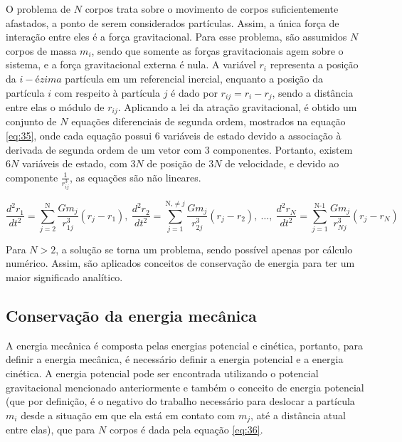 O problema de $N$ corpos trata sobre o movimento de corpos suficientemente afastados, a ponto de serem considerados partículas. Assim, a única força de interação entre eles é a força gravitacional. Para esse problema, são assumidos $N$ corpos de massa $m_{i}$, sendo que somente as forças gravitacionais agem sobre o sistema, e a força gravitacional externa é nula. A variável $r_{i}$ representa a posição da $i-ézima$ partícula em um referencial inercial, enquanto  a posição da partícula $i$ com respeito à partícula $j$ é dado por $r_{ij} = r_{i} - r_{j}$, sendo a distância entre elas o módulo de $r_{ij}$. Aplicando a lei da atração gravitacional, é obtido um conjunto de $N$ equações diferenciais de segunda ordem, mostrados na equação \ref{eq:35}, onde cada equação possui 6 variáveis de estado devido a associação à derivada de segunda ordem de um vetor com 3 componentes. Portanto, existem $6N$ variáveis de estado, com $3N$ de posição de $3N$ de velocidade, e devido ao componente $\frac{1}{r_{ij}^{3}}$, as equações são não lineares.

\begin{equation}
    \frac{d^{2}r_{1}}{dt^{2}} = \sum\limits_{j=2}^{\mbox{N}}\frac{Gm_{j}}{r_{1j}^{3}} (r_{j} - r_{1}), \ 
     \frac{d^{2}r_{2}}{dt^{2}} = \sum\limits_{j=1}^{\mbox{N,$\neq j$}} \frac{Gm_{j}}{r_{2j}^{3}} (r_{j} - r_{2}), \ \dots, \ \frac{d^{2}r_{N}}{dt^{2}} = \sum\limits_{j=1}^{\mbox{N-1}}\frac{Gm_{j}}{r_{Nj}^{3}} (r_{j} - r_{N})
     \label{eq:35}
\end{equation} 

Para $N > 2$, a solução se torna um problema, sendo possível apenas por cálculo numérico. Assim, são aplicados conceitos de conservação de energia para ter um maior significado analítico. 

\subsection{Conservação da energia mecânica}

A energia mecânica é composta pelas energias potencial e cinética, portanto, para definir a energia mecânica, é necessário definir a energia potencial e a energia cinética. A energia potencial pode ser encontrada utilizando o potencial gravitacional mencionado anteriormente e também o conceito de energia potencial (que por definição, é o negativo do trabalho necessário para deslocar a partícula $m_{i}$ desde a situação em que ela está em contato com $m_{j}$, até a distância atual entre elas), que para $N$ corpos é dada pela equação \ref{eq:36}.

